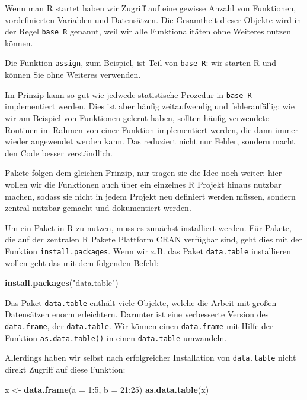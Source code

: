 \documentclass[]{tufte-book}
\newenvironment{Shaded}{}{}
\newcommand{\KeywordTok}[1]{\textcolor[rgb]{0.00,0.44,0.13}{\textbf{#1}}}
\newcommand{\DataTypeTok}[1]{\textcolor[rgb]{0.56,0.13,0.00}{#1}}
\newcommand{\DecValTok}[1]{\textcolor[rgb]{0.25,0.63,0.44}{#1}}
\newcommand{\StringTok}[1]{\textcolor[rgb]{0.25,0.44,0.63}{#1}}
\newcommand{\OperatorTok}[1]{\textcolor[rgb]{0.40,0.40,0.40}{#1}}
\newcommand{\NormalTok}[1]{#1}
\begin{document}
Wenn man R startet haben wir Zugriff auf eine gewisse Anzahl von
Funktionen, vordefinierten Variablen und Datensätzen. Die Gesamtheit
dieser Objekte wird in der Regel \texttt{base\ R} genannt, weil wir alle
Funktionalitäten ohne Weiteres nutzen können.

Die Funktion \texttt{assign}, zum Beispiel, ist Teil von
\texttt{base\ R}: wir starten R und können Sie ohne Weiteres verwenden.

Im Prinzip kann so gut wie jedwede statistische Prozedur in
\texttt{base\ R} implementiert werden. Dies ist aber häufig
zeitaufwendig und fehleranfällig: wie wir am Beispiel von Funktionen
gelernt haben, sollten häufig verwendete Routinen im Rahmen von einer
Funktion implementiert werden, die dann immer wieder angewendet werden
kann. Das reduziert nicht nur Fehler, sondern macht den Code besser
verständlich.

Pakete folgen dem gleichen Prinzip, nur tragen sie die Idee noch weiter:
hier wollen wir die Funktionen auch über ein einzelnes R Projekt hinaus
nutzbar machen, sodass sie nicht in jedem Projekt neu definiert werden
müssen, sondern zentral nutzbar gemacht und dokumentiert werden.

Um ein Paket in R zu nutzen, muss es zunächst installiert werden. Für
Pakete, die auf der zentralen R Pakete Plattform CRAN verfügbar sind,
geht dies mit der Funktion \texttt{install.packages}. Wenn wir z.B. das
Paket \texttt{data.table} installieren wollen geht das mit dem folgenden
Befehl:

\begin{Shaded}
\begin{Highlighting}[]
\KeywordTok{install.packages}\NormalTok{(}\StringTok{"data.table"}\NormalTok{)}
\end{Highlighting}
\end{Shaded}

Das Paket \texttt{data.table} enthält viele Objekte, welche die Arbeit
mit großen Datensätzen enorm erleichtern. Darunter ist eine verbesserte
Version des \texttt{data.frame}, der \texttt{data.table}. Wir können
einen \texttt{data.frame} mit Hilfe der Funktion
\texttt{as.data.table()} in einen \texttt{data.table} umwandeln.

Allerdings haben wir selbst nach erfolgreicher Installation von
\texttt{data.table} nicht direkt Zugriff auf diese Funktion:

\begin{Shaded}
\begin{Highlighting}[]
\NormalTok{x <-}\StringTok{ }\KeywordTok{data.frame}\NormalTok{(}\DataTypeTok{a =} \DecValTok{1}\OperatorTok{:}\DecValTok{5}\NormalTok{, }\DataTypeTok{b =} \DecValTok{21}\OperatorTok{:}\DecValTok{25}\NormalTok{)}
\KeywordTok{as.data.table}\NormalTok{(x)}
\end{Highlighting}
\end{Shaded}
\end{document}
